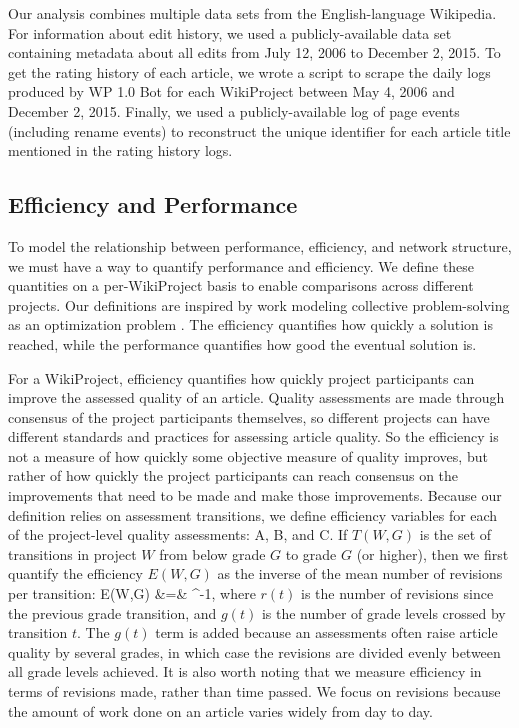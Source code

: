 Our analysis combines multiple data sets from the English-language Wikipedia.
For information about edit history, we used a publicly-available data set containing
metadata about all edits from July 12, 2006 to December 2, 2015.
To get the rating history of each article,
we wrote a script to scrape the daily logs produced by WP 1.0 Bot for each WikiProject
between May 4, 2006 and December 2, 2015.
Finally, we used a publicly-available log of page events (including rename events)
to reconstruct the unique identifier for each article title mentioned in the rating history logs.

\subsection{Efficiency and Performance}

To model the relationship between performance, efficiency, and network structure,
we must have a way to quantify performance and efficiency.
We define these quantities on a per-WikiProject basis to enable comparisons across different
projects.
Our definitions are inspired by work modeling collective problem-solving as an optimization
problem \cite{lazer_network_2007,mason_propagation_2008,mason_collaborative_2012,grim_scientific_2013,barkoczi_social_2016}.
The efficiency quantifies how quickly a solution is reached,
while the performance quantifies how good the eventual solution is.

For a WikiProject, efficiency quantifies how quickly project participants can improve the
assessed quality of an article.
Quality assessments are made through consensus of the project participants themselves,
so different projects can have different standards and practices for assessing article quality.
So the efficiency is not a measure of how quickly some objective measure of quality improves,
but rather of how quickly the project participants can reach consensus on the improvements that
need to be made and make those improvements.
Because our definition relies on assessment transitions, we define efficiency variables for
each of the project-level quality assessments: A, B, and C.
If $T(W,G)$ is the set of transitions in project $W$ from below grade $G$ to grade $G$ (or higher),
then we first quantify the efficiency $E(W,G)$ as the inverse of the mean number of revisions
per transition:
\beq
E(W,G)
&=&
^{-1},
\eeq
where $r(t)$ is the number of revisions since the previous grade transition,
and $g(t)$ is the number of grade levels crossed by transition $t$.
The $g(t)$ term is added because an assessments often raise article quality by several
grades, in which case the revisions are divided evenly between all grade levels achieved.
It is also worth noting that we measure efficiency in terms of revisions made,
rather than time passed.
We focus on revisions because the amount of work done on an article varies widely from day to day.

